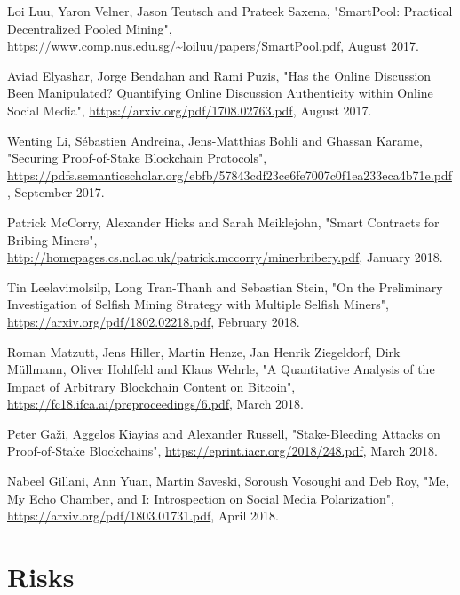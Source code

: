 \documentclass[12pt,a4paper]{article}
\begin{document}
\begin{thebibliography}{9}
Loi Luu, Yaron Velner, Jason Teutsch and Prateek Saxena,
"SmartPool: Practical Decentralized Pooled Mining",
\url{https://www.comp.nus.edu.sg/~loiluu/papers/SmartPool.pdf},
August 2017.

Aviad Elyashar, Jorge Bendahan and Rami Puzis,
"Has the Online Discussion Been Manipulated? Quantifying Online Discussion Authenticity within Online Social Media",
\url{https://arxiv.org/pdf/1708.02763.pdf},
August 2017.

Wenting Li, Sébastien Andreina, Jens-Matthias Bohli and Ghassan Karame,
"Securing Proof-of-Stake Blockchain Protocols",
\url{https://pdfs.semanticscholar.org/ebfb/57843cdf23ce6fe7007c0f1ea233eca4b71e.pdf},
September 2017.

Patrick McCorry, Alexander Hicks and Sarah Meiklejohn,
"Smart Contracts for Bribing Miners",
\url{http://homepages.cs.ncl.ac.uk/patrick.mccorry/minerbribery.pdf},
January 2018.

Tin Leelavimolsilp, Long Tran-Thanh and Sebastian Stein,
"On the Preliminary Investigation of Selfish Mining Strategy with Multiple Selfish Miners",
\url{https://arxiv.org/pdf/1802.02218.pdf},
February 2018.

Roman Matzutt, Jens Hiller, Martin Henze, Jan Henrik Ziegeldorf, Dirk Müllmann, Oliver Hohlfeld and Klaus Wehrle,
"A Quantitative Analysis of the Impact of Arbitrary Blockchain Content on Bitcoin",
\url{https://fc18.ifca.ai/preproceedings/6.pdf},
March 2018.

Peter Gaži, Aggelos Kiayias and Alexander Russell,
"Stake-Bleeding Attacks on Proof-of-Stake Blockchains",
\url{https://eprint.iacr.org/2018/248.pdf},
March 2018.

Nabeel Gillani, Ann Yuan, Martin Saveski, Soroush Vosoughi and Deb Roy,
"Me, My Echo Chamber, and I: Introspection on Social Media Polarization",
\url{https://arxiv.org/pdf/1803.01731.pdf},
April 2018.

\end{thebibliography}

\newpage
\printglossary[type=\acronymtype]

\newpage
\printglossary

\newpage
\appendix

\section{Risks}
\end{document}
